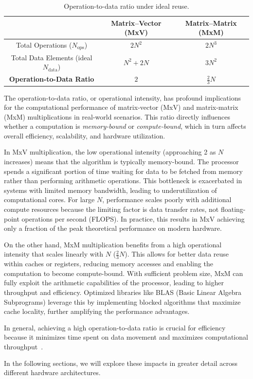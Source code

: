 \begin{table}[h!]
    \centering
    \renewcommand{\arraystretch}{1.5}
    \begin{tabular}{|c|c|c|}
        \hline
        \textbf{ } & \textbf{Matrix–Vector (MxV)} & \textbf{Matrix–Matrix (MxM)} \\
        \hline
        Total Operations (\(N_{\text{ops}}\)) & \(2N^{2}\) & \(2N^{3}\) \\
        \hline
        Total Data Elements (ideal \(N_{\text{data}}\)) & \(N^{2}+2N\) & \(3N^{2}\) \\
        \hline
        \rowcolor[gray]{0.9}
        \textbf{Operation-to-Data Ratio} & {\boldmath$\displaystyle 2$} & {\boldmath$\displaystyle \tfrac{2}{3}N$} \\
        \hline
    \end{tabular}
    \caption{Operation-to-data ratio under ideal reuse.}
    \label{table:operation_data_ratio}
\end{table}

The operation-to-data ratio, or operational intensity, has profound implications for the computational performance of matrix-vector (MxV) and matrix-matrix (MxM) multiplications in real-world scenarios. This ratio directly influences whether a computation is \textit{memory-bound} or \textit{compute-bound}, which in turn affects overall efficiency, scalability, and hardware utilization.

In MxV multiplication, the low operational intensity (approaching 2 as \(N\) increases) means that the algorithm is typically memory-bound. The processor spends a significant portion of time waiting for data to be fetched from memory rather than performing arithmetic operations. This bottleneck is exacerbated in systems with limited memory bandwidth, leading to underutilization of computational cores. For large \(N\), performance scales poorly with additional compute resources because the limiting factor is data transfer rates, not floating-point operations per second (FLOPS). In practice, this results in MxV achieving only a fraction of the peak theoretical performance on modern hardware.

On the other hand, MxM multiplication benefits from a high operational intensity that scales linearly with \(N\) (\(\frac{2}{3}N\)). This allows for better data reuse within caches or registers, reducing memory accesses and enabling the computation to become compute-bound. With sufficient problem size, MxM can fully exploit the arithmetic capabilities of the processor, leading to higher throughput and efficiency. Optimized libraries like BLAS (Basic Linear Algebra Subprograms) leverage this by implementing blocked algorithms that maximize cache locality, further amplifying the performance advantages.

In general, achieving a high operation-to-data ratio is crucial for efficiency because it minimizes time spent on data movement and maximizes computational throughput~\cite{modernjulia}.

In the following sections, we will explore these impacts in greater detail across different hardware architectures.